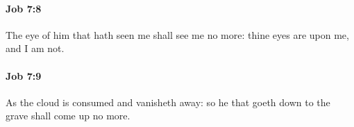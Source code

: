 		\paragraph{Job 7:8} %
			\label{JOB-7-8}

			The eye of him that hath seen me shall see me no more: thine eyes are upon me, and I am not.


		\paragraph{Job 7:9} %
			\label{JOB-7-9}

			As the cloud is consumed and vanisheth away: so he that goeth down to the grave shall come up no more.


